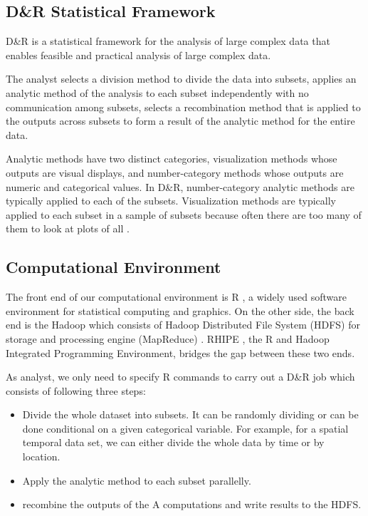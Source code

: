 \subsection{D\&R Statistical Framework}

D\&R \cite{Guha:2012} is a statistical framework for the analysis of large complex
data that enables feasible and practical analysis of large complex data. 

The 
analyst selects a division method to divide the data into subsets, applies an 
analytic method of the analysis to each subset independently with no communication
among subsets, selects a recombination method that is applied to the outputs 
across subsets to form a result of the analytic method for the entire data.

Analytic methods have two distinct categories, visualization methods whose outputs
are visual displays, and number-category methods whose outputs are numeric and 
categorical values. In D\&R, number-category analytic methods are typically applied
to each of the subsets. Visualization methods are typically applied to each subset 
in a sample of subsets because often there are too many of them to look at plots 
of all \cite{Hafen:2013}.
 
\subsection{Computational Environment}

The front end of our computational environment is R \cite{R}, a widely used 
software environment for statistical computing and graphics. On the other side, the
back end is the Hadoop which consists of Hadoop Distributed File 
System (HDFS) \cite{HDFS} for storage and processing engine (MapReduce) 
\cite{mapreduce}. RHIPE \cite{Guha:2010}, the R and Hadoop Integrated Programming 
Environment, bridges the gap between these two ends. 

As analyst, we only need to specify R commands to carry out a D\&R job which
consists of following three steps:
\begin{itemize}
\item Divide the whole dataset into subsets. It can be randomly dividing or
can be done conditional on a given categorical variable. For example, for a spatial
temporal data set, we can either divide the whole data by time or by location. 
\item Apply the analytic method to each subset parallelly.   
\item recombine the outputs of the A computations and write results to the HDFS. 
\end{itemize}  

